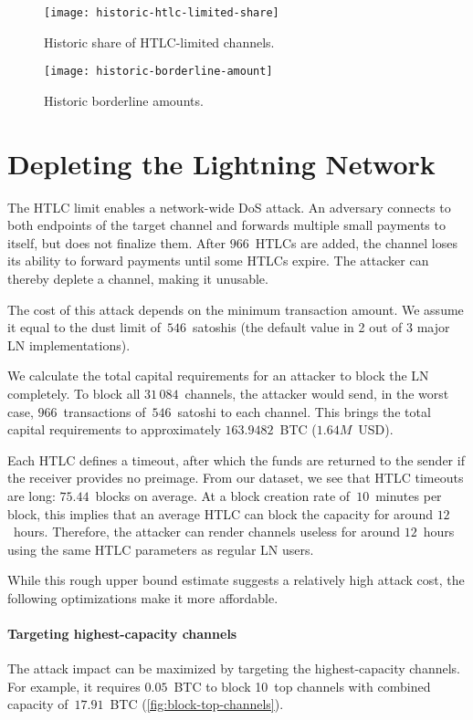 \begin{figure}[tb]
	\centering
	\texttt{[image: historic-htlc-limited-share]}
	\caption{Historic share of HTLC-limited channels.}
	\label{fig:historic-htlc-limited-share}
\end{figure}

\begin{figure}[tb]
	\centering
	\texttt{[image: historic-borderline-amount]}
	\caption{Historic borderline amounts.}
	\label{fig:historic-borderline-amount}
\end{figure}


\section{Depleting the Lightning Network}

The HTLC limit enables a network-wide DoS attack.
An adversary connects to both endpoints of the target channel and forwards multiple small payments to itself, but does not finalize them.
After $966$~HTLCs are added, the channel loses its ability to forward payments until some HTLCs expire.
The attacker can thereby deplete a channel, making it unusable.

The cost of this attack depends on the minimum transaction amount.
We assume it equal to the dust limit of~$546$~satoshis (the default value in 2 out of 3 major LN implementations).

We calculate the total capital requirements for an attacker to block the LN completely.
To block all $31\,084$~channels, the attacker would send, in the worst case, $966$~transactions of~$546$~satoshi to each channel.
This brings the total capital requirements to approximately $163.9482$~BTC ($1.64M$~USD).

Each HTLC defines a timeout, after which the funds are returned to the sender if the receiver provides no preimage.
From our dataset, we see that HTLC timeouts are long: $75.44$~blocks on average.
At a block creation rate of~$10$~minutes per block, this implies that an average HTLC can block the capacity for around $12$~hours.
Therefore, the attacker can render channels useless for around $12$~hours using the same HTLC parameters as regular LN users.

While this rough upper bound estimate suggests a relatively high attack cost, the following optimizations make it more affordable.


\paragraph{Targeting highest-capacity channels}
The attack impact can be maximized by targeting the highest-capacity channels.
For example, it requires $0.05$~BTC to block 10~top channels with combined capacity of~$17.91$~BTC (\cref{fig:block-top-channels}).

